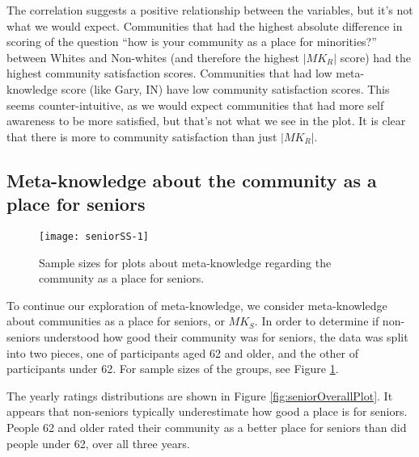 \documentclass[smallextended]{svjour3}\usepackage[]{graphicx}\usepackage[]{color}
\newenvironment{knitrout}{}{} %
\begin{document}
The correlation suggests a positive relationship between the variables, but it's not what we would expect. Communities that had the highest absolute difference in scoring of the question ``how is your community as a place for minorities?'' between Whites and Non-whites (and therefore the highest $|MK_R|$ score) had the highest community satisfaction scores. Communities that had low meta-knowledge score (like Gary, IN) have low community satisfaction scores. This seems counter-intuitive, as we would expect communities that had more self awareness to be more satisfied, but that's not what we see in the plot. It is clear that there is more to community satisfaction than just $|MK_R|$. 


\subsection{Meta-knowledge about the community as a place for seniors}
\label{mseniors}



\begin{knitrout}
\color{fgcolor}\begin{figure}

{\centering \texttt{[image: seniorSS-1]} 

}

\caption[Sample sizes for plots about meta-knowledge regarding the community as a place for seniors]{Sample sizes for plots about meta-knowledge regarding the community as a place for seniors.}\label{fig:seniorSS}
\end{figure}


\end{knitrout}




To continue our exploration of meta-knowledge, we consider meta-knowledge about communities as a place for seniors, or $MK_S$. In order to determine if non-seniors understood how good their community was for seniors, the data was split into two pieces, one of participants aged 62 and older, and the other of participants under 62. For sample sizes of the groups, see Figure \ref{fig:seniorSS}.

The yearly ratings distributions are shown in Figure \ref{fig:seniorOverallPlot}. It appears that non-seniors typically underestimate how good a place is for seniors. People 62 and older rated their community as a better place for seniors than did people under 62, over all three years.  
\end{document}
